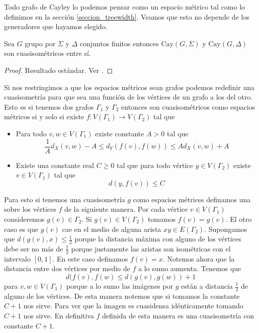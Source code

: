 \documentclass[tesis.tex]{subfiles}
\begin{document}
Todo grafo de Cayley lo podemos pensar como un espacio métrico tal como lo definimos en la sección \ref{seccion_treewidth}.  
Veamos que esto no depende de los generadores que hayamos elegido.

\begin{prop}
	Sea $G$ grupo \fg por $\Sigma$ y $\Delta$ conjuntos finitos entonces $\text{Cay}(G,\Sigma)$ y $\text{Cay}(G, \Delta)$ son cuasisométricos entre sí.
\end{prop}

\begin{proof}
	Resultado estándar. Ver \cite{bridson2013metric}.
\end{proof}


\begin{obs}
	Si nos restringimos a que los espacios métricos sean grafos podemos redefinir una cuasisometría para que sea una función de los vértices de un grafo a los del otro.
	Esto es si tenemos dos grafos $\Gamma_1$ y $\Gamma_2$ entonces son cuasisométricos como espacios métricos si y solo si existe $f:V(\Gamma_1) \to V(\Gamma_2)$ tal que 
	\begin{itemize}
		\item Para todo $v,w \in V(\Gamma_1)$ existe constante $A > 0$ tal que 
		\[
		\frac{1}{A} d_X(v,w) - A \le d_Y(f(v),f(w)) \le A d_X(v,w) + A
		\]
		\item Existe una constante real $C \ge 0$ tal que para todo vértice $y \in V(\Gamma_2)$ existe $v \in V(\Gamma_1)$ tal que 
		\[
		d(y,f(v)) \le C
		\]
	\end{itemize}
	
	Para esto si tenemos una cuasisometría $g$ como espacios métrices definamos una sobre los vértices $f$ de la siguiente manera.
	Por cada vértice $v \in V(\Gamma_1)$ consideremos $g(v) \in \Gamma_2$. 
	Si $g(v) \in V(\Gamma_2)$ tomamos $f(v)=g(v)$.
	El otro caso es que $g(v)$ cae en el medio de alguna arista $xy \in E(\Gamma_2)$. 
	Supongamos que $d(g(v),x) \le \frac{1}{2}$ porque la distancia máxima con alguno de los vértices debe ser no más de $\frac{1}{2}$ porque justamente las aristas son isométricas con el intervalo $[0,1]$. 
	En este caso definamos $f(v) = x$.
	Notemos ahora que la distancia entre dos vértices por medio de $f$ a lo sumo aumenta. 
	Tenemos que 
	\[
	d(f(v),f(w) \le d (g(v),g(w)) + 1
	\]
	para $v,w \in V(\Gamma_1)$ porque a lo sumo las imágenes por $g$ están a distancia $\frac{1}{2}$ de alguno de los vértices.
	De esta manera notemos que si tomamos la constante $C+1$ nos sirve.
	Para ver que la imagen es cuasidensa idénticamente tomando $C+1$ nos sirve.
	En definitiva $f$ definida de esta manera es una cuasisometría con constante $C+1$.	
\end{obs}
%
\end{document}
